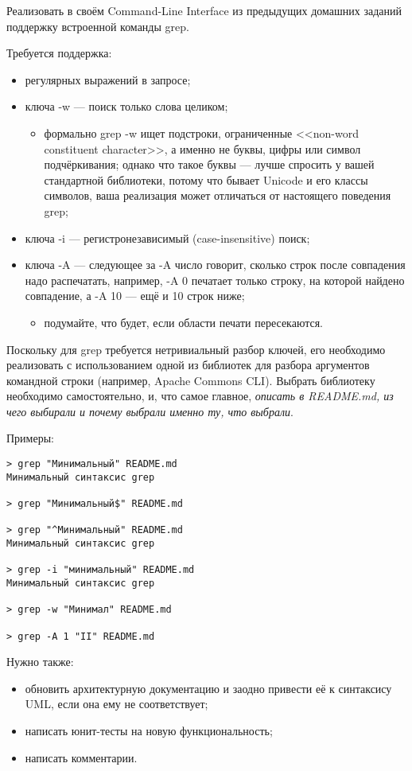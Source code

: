 \documentclass[a5paper]{homework}
\begin{document}

Реализовать в своём Command-Line Interface из предыдущих домашних заданий поддержку встроенной команды grep.

Требуется поддержка:

\begin{itemize}
    \item регулярных выражений в запросе;
    \item ключа -w --- поиск только слова целиком;
    \begin{itemize}
        \item формально grep -w ищет подстроки, ограниченные <<non-word constituent character>>, а именно не буквы, цифры или символ подчёркивания; однако что такое буквы --- лучше спросить у вашей стандартной библиотеки, потому что бывает Unicode и его классы символов, ваша реализация может отличаться от настоящего поведения grep;
    \end{itemize}
    \item ключа -i --- регистронезависимый (case-insensitive) поиск;
    \item ключа -A --- следующее за -A число говорит, сколько строк после совпадения надо распечатать, например, -A 0 печатает только строку, на которой найдено совпадение, а -A 10 --- ещё и 10 строк ниже;
    \begin{itemize}
        \item подумайте, что будет, если области печати пересекаются.
    \end{itemize}
\end{itemize}

Поскольку для grep требуется нетривиальный разбор ключей, его необходимо реализовать с использованием одной из библиотек для разбора аргументов командной строки (например, Apache Commons CLI). Выбрать библиотеку необходимо самостоятельно, и, что самое главное, \emph{описать в README.md, из чего выбирали и почему выбрали именно ту, что выбрали}.

Примеры:

\begin{verbatim}
> grep "Минимальный" README.md
Минимальный синтаксис grep

> grep "Минимальный$" README.md

> grep "^Минимальный" README.md
Минимальный синтаксис grep

> grep -i "минимальный" README.md
Минимальный синтаксис grep

> grep -w "Минимал" README.md

> grep -A 1 "II" README.md
\end{verbatim}

Нужно также:

\begin{itemize}
    \item обновить архитектурную документацию и заодно привести её к синтаксису UML, если она ему не соответствует;
    \item написать юнит-тесты на новую функциональность;
    \item написать комментарии.
\end{itemize}
\end{document}
